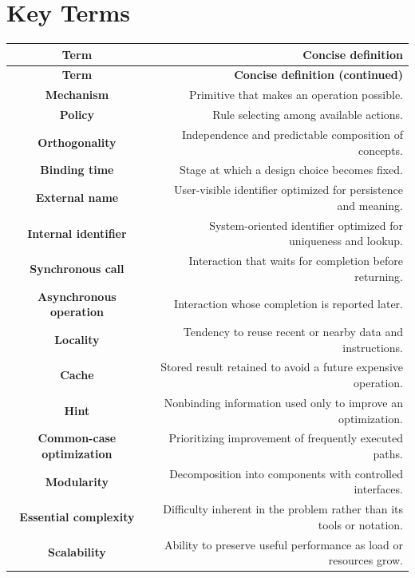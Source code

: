 \documentclass[10pt,letterpaper]{article}
\begin{document}
\section*{Key Terms}
\small
\begin{longtable}{C N}
\color{white}\textbf{Term} & \color{white}\textbf{Concise definition}\\
\endfirsthead
{}\color{white}\textbf{Term} & \color{white}\textbf{Concise definition (continued)}\\
\endhead
\textbf{Mechanism} & Primitive that makes an operation possible.\\\hline
\textbf{Policy} & Rule selecting among available actions.\\\hline
\textbf{Orthogonality} & Independence and predictable composition of concepts.\\\hline
\textbf{Binding time} & Stage at which a design choice becomes fixed.\\\hline
\textbf{External name} & User-visible identifier optimized for persistence and meaning.\\\hline
\textbf{Internal identifier} & System-oriented identifier optimized for uniqueness and lookup.\\\hline
\textbf{Synchronous call} & Interaction that waits for completion before returning.\\\hline
\textbf{Asynchronous operation} & Interaction whose completion is reported later.\\\hline
\textbf{Locality} & Tendency to reuse recent or nearby data and instructions.\\\hline
\textbf{Cache} & Stored result retained to avoid a future expensive operation.\\\hline
\textbf{Hint} & Nonbinding information used only to improve an optimization.\\\hline
\textbf{Common-case optimization} & Prioritizing improvement of frequently executed paths.\\\hline
\textbf{Modularity} & Decomposition into components with controlled interfaces.\\\hline
\textbf{Essential complexity} & Difficulty inherent in the problem rather than its tools or notation.\\\hline
\textbf{Scalability} & Ability to preserve useful performance as load or resources grow.\\\hline
\end{longtable}
\normalsize
\end{document}
